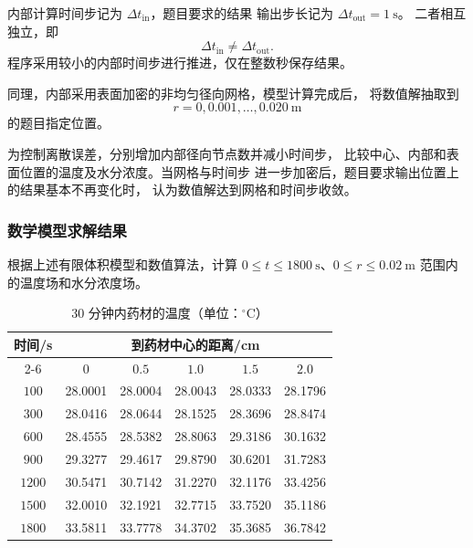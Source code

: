 \documentclass[12pt,a4paper]{article}
\begin{document}
内部计算时间步记为 $\Delta t_{\mathrm{in}}$，题目要求的结果
输出步长记为 $\Delta t_{\mathrm{out}}=1\ \mathrm{s}$。
二者相互独立，即
\begin{equation}
\Delta t_{\mathrm{in}}
\neq
\Delta t_{\mathrm{out}}.
\end{equation}
程序采用较小的内部时间步进行推进，仅在整数秒保存结果。

同理，内部采用表面加密的非均匀径向网格，模型计算完成后，
将数值解抽取到
\begin{equation}
r=0,0.001,\ldots,0.020\ \mathrm{m}
\end{equation}
的题目指定位置。

为控制离散误差，分别增加内部径向节点数并减小时间步，
比较中心、内部和表面位置的温度及水分浓度。当网格与时间步
进一步加密后，题目要求输出位置上的结果基本不再变化时，
认为数值解达到网格和时间步收敛。

\subsubsection{数学模型求解结果}

根据上述有限体积模型和数值算法，计算
$0\le t\le1800\ \mathrm{s}$、$0\le r\le0.02\ \mathrm{m}$
范围内的温度场和水分浓度场。

\begin{table}[H]
\centering
\caption{30 分钟内药材的温度（单位：$^\circ$C）}
\label{tab:t}
\begin{tabular}{cccccc}
\toprule
\multirow{2}{*}{时间/s}
& \multicolumn{5}{c}{到药材中心的距离/cm}\\
\cmidrule(lr){2-6}
& $0$ & $0.5$ & $1.0$ & $1.5$ & $2.0$\\
\midrule
$100$  & 28.0001 & 28.0004 & 28.0043 & 28.0333 & 28.1796\\
$300$  & 28.0416 & 28.0644 & 28.1525 & 28.3696 & 28.8474\\
$600$  & 28.4555 & 28.5382 & 28.8063 & 29.3186 & 30.1632\\
$900$  & 29.3277 & 29.4617 & 29.8790 & 30.6201 & 31.7283\\
$1200$ & 30.5471 & 30.7142 & 31.2270 & 32.1176 & 33.4256\\
$1500$ & 32.0010 & 32.1921 & 32.7715 & 33.7520 & 35.1186\\
$1800$ & 33.5811 & 33.7778 & 34.3702 & 35.3685 & 36.7842\\
\bottomrule
\end{tabular}
\end{table}
\end{document}
